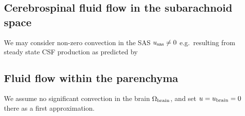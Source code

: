 \documentclass[fleqn,10pt]{wlscirep}
\newcommand{\draft}[1]{\textcolor{gray}{#1}}
\begin{document}
\subsection*{Cerebrospinal fluid flow in the subarachnoid space}

We may consider non-zero convection in the SAS $u_{\rm sas} \not = 0$ e.g.~resulting from steady state CSF production as predicted by~\cite{hornkjol2022csf}

\draft{\lipsum[1]}

\subsection*{Fluid flow within the parenchyma}

We assume no significant convection in the brain $\Omega_{\rm brain}$, and set $u = u_{\rm brain} = 0$ there as a first approximation. 
\end{document}
